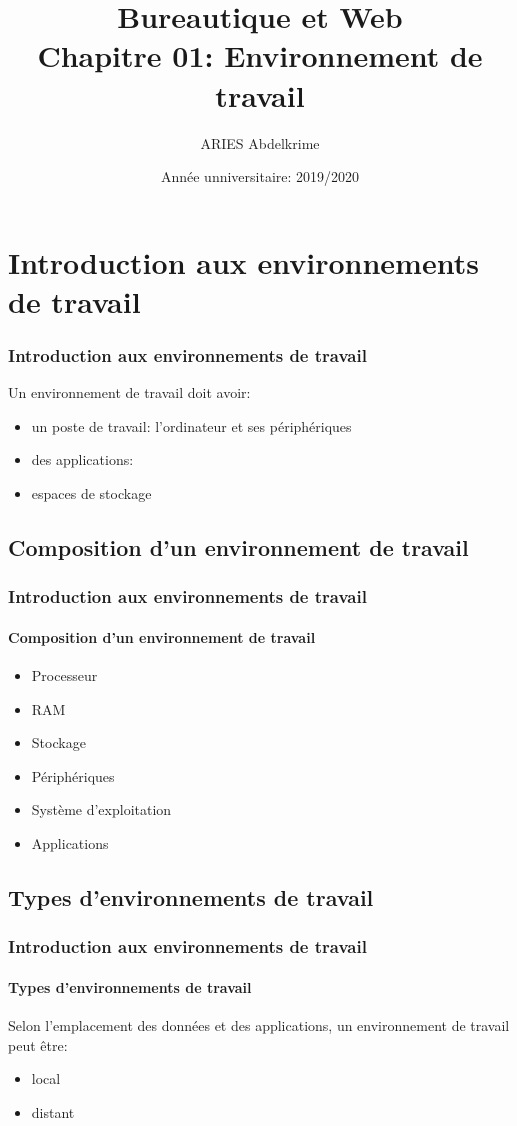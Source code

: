 \documentclass{beamer}
\title[BWEB: 01- Environnement] %
{Bureautique et Web \\Chapitre 01: Environnement de travail}
\institute{ %
École  nationale Supérieure d'Informatique (ESI, ex. INI), Algérie
}
\author[ \textbf{\footnotesize  \insertframenumber/\inserttotalframenumber} \hspace*{\fill} ESI (2019-2020)] %
{ARIES Abdelkrime}
\date{Année unniversitaire: 2019/2020} %
\begin{document}
\begin{frame}[plain]
	\maketitle
\end{frame}

\section{Introduction aux environnements de travail}

\begin{frame}
\frametitle{Introduction aux environnements de travail}

Un environnement de travail doit avoir:
\begin{itemize}
	\item un poste de travail: l'ordinateur et ses périphériques
	\item des applications: 
	\item espaces de stockage
\end{itemize}

\end{frame}

\subsection{Composition d'un environnement de travail}

\begin{frame}
\frametitle{Introduction aux environnements de travail}
\framesubtitle{Composition d'un environnement de travail}
\begin{itemize}
	\item Processeur 
	\item RAM 
	\item Stockage
	\item Périphériques 
	\item Système d'exploitation
	\item Applications 
\end{itemize}

\end{frame}

\subsection{Types d'environnements de travail}

\begin{frame}
\frametitle{Introduction aux environnements de travail}
\framesubtitle{Types d'environnements de travail}

Selon l'emplacement des données et des applications, un environnement de travail peut être: 
\begin{itemize}
	\item local
	\item distant
\end{itemize}

\end{frame}
\end{document}
